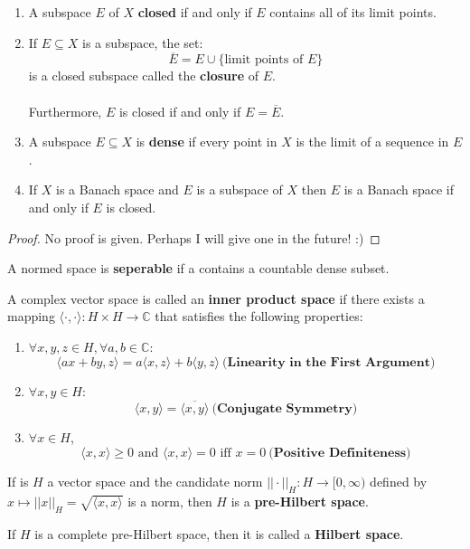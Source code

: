 \documentclass[12pt]{article}
\newenvironment{theorem}[2][Theorem]{\begin{trivlist}
\item[\hskip \labelsep {\bfseries #1}\hskip \labelsep {\bfseries #2.}]}{\end{trivlist}}
\newenvironment{definition}[2][Definition]{\begin{trivlist}
\item[\hskip \labelsep {\bfseries #1}\hskip \labelsep {\bfseries #2.}]}{\end{trivlist}}
\begin{document}
\begin{theorem}{(Closed Subspaces)}
    \begin{enumerate}[label=(\alph*)]
        \item A subspace $E$ of $X$ \textbf{closed} if and only if $E$ contains all of its limit points. 
        \item If $E \subseteq X$ is a subspace, the set:
        $$\overline{E} = E \cup \{\text{limit points of }E\}$$
        is a closed subspace called the \textbf{closure} of $E$. \\ \\
        Furthermore, $E$ is closed if and only if $E = \overline{E}$.
        \item A subspace $E \subseteq X$ is \textbf{dense} if every point in $X$ is the limit of a sequence in $E$.
        \item If $X$ is a Banach space and $E$ is a subspace of $X$ then $E$ is a Banach space if and only if $E$ is closed.
    \end{enumerate}
    \begin{proof}
        No proof is given. Perhaps I will give one in the future! :)
    \end{proof}
\end{theorem}

\begin{definition}{(Seperability)}
    A normed space is \textbf{seperable} if a contains a countable dense subset.
\end{definition}

\begin{definition}{(Inner Product Space))}
    A complex vector space is called an \textbf{inner product space} if there exists a mapping $\langle \cdot, \cdot \rangle : H \times H \rightarrow \mathbb{C}$ that satisfies the following properties:
    \begin{enumerate}[label=(\alph*)]
        \item $\forall x, y, z \in H, \forall a, b \in \mathbb{C}$:
        $$\langle ax + by, z \rangle = a\langle x, z \rangle + b\langle y, z \rangle \: \textbf{(Linearity in the First Argument)}$$
        \item $\forall x, y \in H$:
        $$\langle x, y \rangle = \overline{\langle x, y \rangle} \: \textbf{(Conjugate Symmetry)}$$
        \item $\forall x \in H$, 
        $$\langle x , x \rangle \geq 0 \text{ and } \langle x, x \rangle = 0 \text{ iff } x = 0 \: \textbf{(Positive Definiteness)}$$
    \end{enumerate}
\end{definition}

\begin{definition}{(Pre-Hilbert Space)}
    If is $H$ a vector space and the candidate norm $||\cdot||_H : H \rightarrow [0,\infty)$ defined by $x \mapsto ||x||_H = \sqrt{\langle x, x \rangle}$ is a norm, then $H$ is a \textbf{pre-Hilbert space}.
\end{definition}

\begin{definition}{(Hilbert Space)}
    If $H$ is a complete pre-Hilbert space, then it is called a \textbf{Hilbert space}. 
\end{definition}
\end{document}
